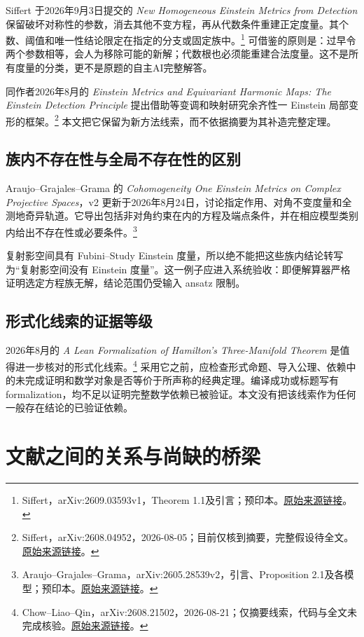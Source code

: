 \documentclass[11pt,a4paper]{article}
\theoremstyle{definition}
\newcommand{\src}[3]{\footnote{\raggedright #1，#2。\href{#3}{原始来源链接}。}}
\begin{document}
Siffert 于2026年9月3日提交的 \emph{New Homogeneous Einstein Metrics from Detection} 保留破坏对称性的参数，消去其他不变方程，再从代数条件重建正定度量。其个数、阈值和唯一性结论限定在指定的分支或固定族中。\src{Siffert}{arXiv:2609.03593v1，Theorem 1.1及引言；预印本}{https://arxiv.org/html/2609.03593v1}
可借鉴的原则是：过早令两个参数相等，会人为移除可能的新解；代数根也必须能重建合法度量。这不是所有度量的分类，更不是原题的自主AI完整解答。

同作者2026年8月的 \emph{Einstein Metrics and Equivariant Harmonic Maps: The Einstein Detection Principle} 提出借助等变调和映射研究余齐性一 Einstein 局部变形的框架。\src{Siffert}{arXiv:2608.04952，2026-08-05；目前仅核到摘要，完整假设待全文}{https://arxiv.org/abs/2608.04952}
本文把它保留为新方法线索，而不依据摘要为其补造完整定理。

\subsection{族内不存在性与全局不存在性的区别}

Araujo--Grajales--Grama 的 \emph{Cohomogeneity One Einstein Metrics on Complex Projective Spaces}，v2 更新于2026年8月24日，讨论指定作用、对角不变度量和全测地奇异轨道。它导出包括非对角约束在内的方程及端点条件，并在相应模型类别内给出不存在性或必要条件。\src{Araujo--Grajales--Grama}{arXiv:2605.28539v2，引言、Proposition 2.1及各模型；预印本}{https://arxiv.org/html/2605.28539v2}

复射影空间具有 Fubini--Study Einstein 度量，所以绝不能把这些族内结论转写为“复射影空间没有 Einstein 度量”。这一例子应进入系统验收：即便解算器严格证明选定方程族无解，结论范围仍受输入 ansatz 限制。

\subsection{形式化线索的证据等级}

2026年8月的 \emph{A Lean Formalization of Hamilton's Three-Manifold Theorem} 是值得进一步核对的形式化线索。\src{Chow--Liao--Qin}{arXiv:2608.21502，2026-08-21；仅摘要线索，代码与全文未完成核验}{https://arxiv.org/abs/2608.21502}
采用它之前，应检查形式命题、导入公理、依赖中的未完成证明和数学对象是否等价于所声称的经典定理。编译成功或标题写有 formalization，均不足以证明完整数学依赖已被验证。本文没有把该线索作为任何一般存在结论的已验证依赖。

\section{文献之间的关系与尚缺的桥梁}\label{sec:bridges}
\end{document}
